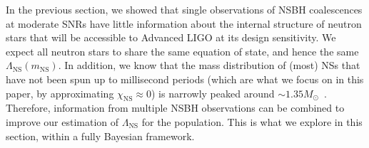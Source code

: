 \documentclass[aps,prd,amsmath,floats,floatfix, twocolumn,
superscriptaddress,nofootinbib,showpacs]{revtex4-1}
\newcommand{\lambdans}{\Lambda_\mathrm{NS}}
\newcommand{\chins}{\chi_\mathrm{NS}}
\newcommand{\mns}{m_\mathrm{NS}}
\begin{document}
In the previous section, we showed that single observations of NSBH coalescences
at moderate SNRs have little information about the internal structure of neutron
stars that will be accessible to Advanced LIGO at its design sensitivity. We
expect all neutron stars to share the same equation of state, and hence the same
$\lambdans(\mns)$. In addition, we know that the mass distribution of (most) NSs
that have not been spun up to millisecond periods (which are what we focus on in 
this paper, by approximating $\chins\approx 0$) is narrowly peaked around
$\sim 1.35M_\odot$~\cite{Kiziltan2013}. Therefore, information from multiple NSBH
observations can be combined to improve our estimation of $\lambdans$ for the
population. This is what we explore in this section, within a fully Bayesian 
framework. 
\end{document}
